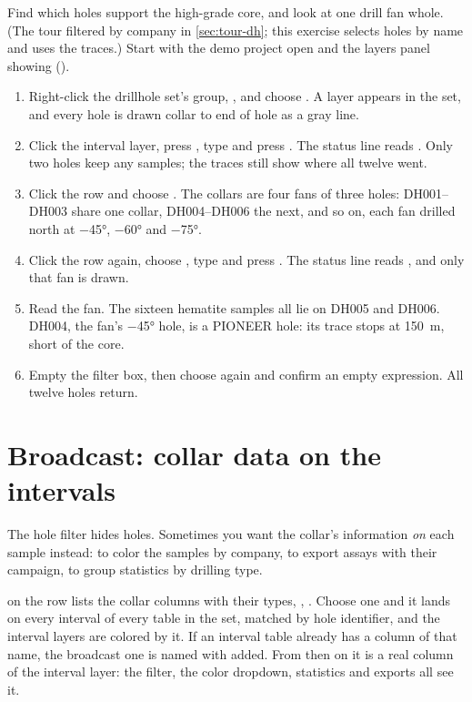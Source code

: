 \begin{tryit}
Find which holes support the high-grade core, and look at one drill fan whole. (The tour filtered by company in \cref{sec:tour-dh}; this exercise selects holes by name and uses the traces.) Start with the demo project open and the layers panel showing ().
\begin{enumerate}
\item Right-click the drillhole set's group, , and choose . A  layer appears in the set, and every hole is drawn collar to end of hole as a gray line.
\item Click the interval layer, press \key{/}, type  and press . The status line reads . Only two holes keep any samples; the traces still show where all twelve went.
\item Click the  row and choose . The collars are four fans of three holes: DH001–DH003 share one collar, DH004–DH006 the next, and so on, each fan drilled north at −45°, −60° and −75°.
\item Click the  row again, choose , type  and press . The status line reads , and only that fan is drawn.
\item Read the fan. The sixteen hematite samples all lie on DH005 and DH006. DH004, the fan's −45° hole, is a PIONEER hole: its trace stops at 150~m, short of the core.
\item Empty the filter box, then choose  again and confirm an empty expression. All twelve holes return.
\end{enumerate}
\end{tryit}

\section{Broadcast: collar data on the intervals}\label{sec:dh-broadcast}

The hole filter hides holes. Sometimes you want the collar's information \emph{on} each sample instead: to color the samples by company, to export assays with their campaign, to group statistics by drilling type.

 on the  row lists the collar columns with their types, , . Choose one and it lands on every interval of every table in the set, matched by hole identifier, and the interval layers are colored by it. If an interval table already has a column of that name, the broadcast one is named with  added. From then on it is a real column of the interval layer: the filter, the color dropdown, statistics and exports all see it.

